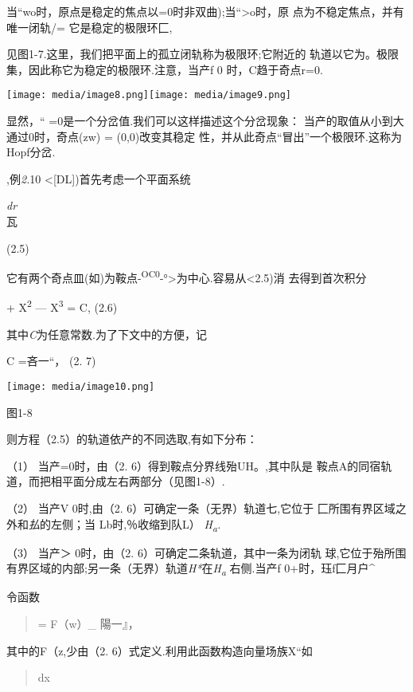 \documentclass{article}
\begin{document}
当``wo时，原点是稳定的焦点以=0时非双曲);当``\textgreater{}o时，原
点为不稳定焦点，并有唯一闭轨/= 它是稳定的极限环匚,

见图1-7.这里，我们把平面上的孤立闭轨称为极限环;它附近的
轨道以它为。极限集，因此称它为稳定的极限环.注意，当产f 0
时，C趋于奇点r=0.

\texttt{[image: media/image8.png]}\texttt{[image: media/image9.png]}

显然，`` =0是一个分岔值.我们可以这样描述这个分岔现象：
当产的取值从小到大通过0时，奇点(zw) = (0,0)改变其稳定
性，并从此奇点``冒出''一个极限环.这称为Hopf分岔.

,例\emph{2.}10 \textless{}{[}DL{]})首先考虑一个平面系统

\emph{dr\\
}瓦

(2.5)

它有两个奇点皿(如)为鞍点-\textsuperscript{OC0}-°\textgreater{}为中心.容易从\textless{}2.5)消
去得到首次积分

+ X\textsuperscript{2} --- X\textsuperscript{3} = C, (2.6)

其中\emph{C}为任意常数.为了下文中的方便，记

C =吝一``， (2. 7)

\texttt{[image: media/image10.png]}

图1-8

则方程（2.5）的轨道依产的不同选取,有如下分布：

（1） 当产=0时，由（2. 6）得到鞍点分界线殆UH。,其中队是
鞍点A的同宿轨道，而把相平面分成左右两部分（见图1-8）.

（2） 当产V 0时,由（2. 6）可确定一条（无界）轨道七,它位于
匚所围有界区域之外和\emph{払}的左侧；当 Lb时,％收缩到队L）
\emph{H\textsubscript{a}.}

（3） 当产＞ 0时，由（2. 6）可确定二条轨道，其中一条为闭轨
球,它位于殆所围有界区域的内部;另一条（无界）轨道\emph{H*}在\emph{H\textsubscript{a
}}右侧.当产f 0+时，珏f匚月户\^{}

令函数

\begin{quote}
= F（w）\_ 陽一』，
\end{quote}

其中的F（z,少由（2. 6）式定义.利用此函数构造向量场族X``如

\begin{quote}
dx
\end{quote}
\end{document}
